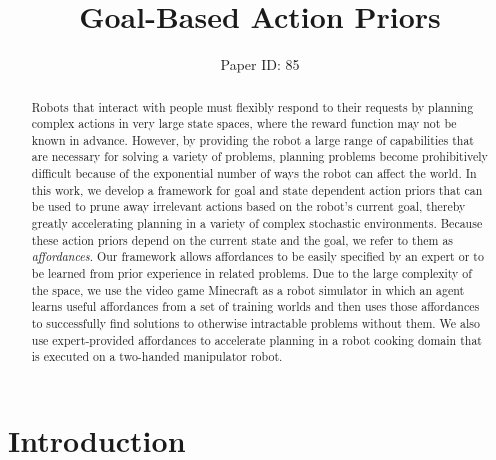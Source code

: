\documentclass[letterpaper]{article}
\begin{document}
\title{Goal-Based Action Priors}


\author{Paper ID: 85}

\maketitle

\begin{abstract}
Robots that interact with people must flexibly respond to their
requests by planning complex actions in very large state spaces, where
the reward function may not be known in advance.  However, by
providing the robot a large range of capabilities that are necessary
for solving a variety of problems, planning problems become
prohibitively difficult because of the exponential number of ways the
robot can affect the world.  In this work, we develop a framework for
goal and state dependent action priors that can be used to prune away
irrelevant actions based on the robot's current goal, thereby greatly
accelerating planning in a variety of complex stochastic environments.
Because these action priors depend on the current state and the goal,
we refer to them as {\em affordances}.  Our framework allows
affordances to be easily specified by an expert or to be learned from
prior experience in related problems. Due to the large complexity of
the space, we use the video game Minecraft as a robot simulator in
which an agent learns useful affordances from a set of training worlds
and then uses those affordances to successfully find solutions to
otherwise intractable problems without them. We also use
expert-provided affordances to accelerate planning in a robot cooking
domain that is executed on a two-handed manipulator robot.
\end{abstract}


\section{Introduction}
\label{sec:introduction}
\end{document}
